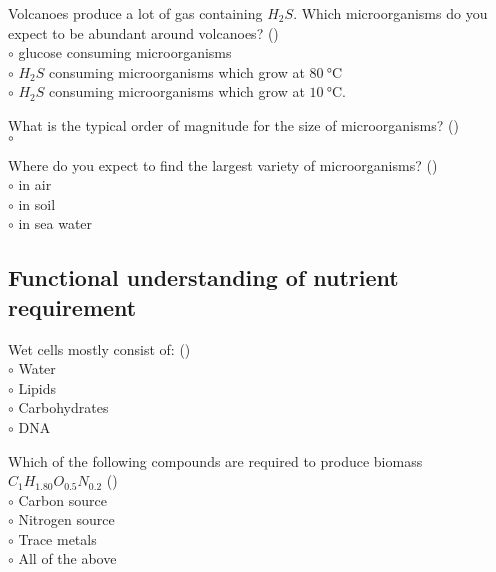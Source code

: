 \documentclass[]{beamer}
\begin{document}
\begin{frame}[shrink] {}
\addtocounter{questions}{1}
\color{blue}
Volcanoes produce a lot of gas containing $H_2S$. Which microorganisms do
you expect to be abundant around volcanoes? ()\\
\color{black}
\setlength{\parindent}{-0.4cm}
{\color{red}$\circ$} glucose consuming microorganisms\\
{\color{red}$\circ$} $H_2S$ consuming microorganisms which grow at $\SI{80}{\degreeCelsius}$\\
{\color{red}$\circ$} $H_2S$ consuming microorganisms which grow at $\SI{10}{\degreeCelsius}$. 
\end{frame}
\begin{frame}[shrink] {}
\addtocounter{questions}{1}
\color{blue}
What is the typical order of magnitude for the size of microorganisms? ()\\
\color{black}
\setlength{\parindent}{-0.4cm}
{\color{red}$\circ$}\\
\end{frame}
\begin{frame}[shrink] {}
\addtocounter{questions}{1}
\color{blue}
Where do you expect to find the largest variety of microorganisms? ()\\
\color{black}
\setlength{\parindent}{-0.4cm}
{\color{red}$\circ$} in air\\
{\color{red}$\circ$} in soil\\
{\color{red}$\circ$} in sea water\\
\end{frame}
\subsection{Functional understanding of nutrient requirement}
\setcounter{questions}{0}
\begin{frame}[shrink] {}
\addtocounter{questions}{1}
\color{blue}
Wet cells mostly consist of: ()\\
\color{black}
\setlength{\parindent}{-0.4cm}
{\color{red}$\circ$} Water\\ 
{\color{red}$\circ$} Lipids\\
{\color{red}$\circ$} Carbohydrates\\
{\color{red}$\circ$} DNA \\
\end{frame}
\begin{frame}[shrink] {}
\addtocounter{questions}{1}
\color{blue}
Which of the following compounds are required to produce biomass $C_1H_{1.80}O_{0.5}N_{0.2}$ ()\\
\color{black}
\setlength{\parindent}{-0.4cm}
{\color{red}$\circ$}  Carbon source\\
{\color{red}$\circ$} Nitrogen source\\
{\color{red}$\circ$} Trace metals\\
{\color{red}$\circ$} All of the above \\
\end{frame}
\end{document}
